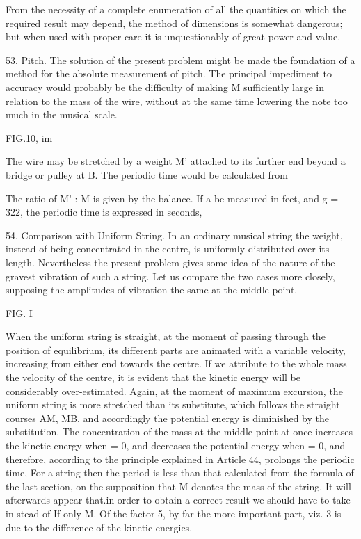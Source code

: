 From the necessity of a complete enumeration of all the quantities on which the
required result may depend, the method of dimensions is somewhat dangerous; but
when used with proper care it is unquestionably of great power and value.

53. Pitch.  The solution of the present problem might be made the foundation of
a method for the absolute measurement of pitch. The principal impediment to
accuracy would probably be the difficulty of making M sufficiently large in
relation to the mass of the wire, without at the same time lowering the note
too much in the musical scale.

FIG.10, im

The wire may be stretched by a weight M' attached to its further end beyond a
bridge or pulley at B. The periodic time would be calculated from

The ratio of M' : M is given by the balance. If a be measured in feet, and g =
322, the periodic time is expressed in seconds,

54.  Comparison with Uniform String.
In an ordinary musical string the weight, instead of being
concentrated in the centre, is uniformly distributed over its length.
Nevertheless the present problem gives some idea of the nature of the gravest
vibration of such a string. Let us compare the two cases more closely,
supposing the amplitudes of vibration the same at the middle point.

FIG. I

When the uniform string is straight, at the moment of passing through the
position of equilibrium, its different parts are animated with a variable
velocity, increasing from either end towards the centre. If we attribute to the
whole mass the velocity of the centre, it is evident that the kinetic energy
will be considerably over-estimated. Again, at the moment of maximum excursion,
the uniform string is more stretched than its substitute, which follows the
straight courses AM, MB, and accordingly the potential energy is diminished by
the substitution. The concentration of the mass at the middle point at once
increases the kinetic energy when = 0, and decreases the potential energy when
= 0, and therefore, according to the principle explained in Article 44,
prolongs the periodic time, For a string then the period is less than that
calculated from the formula of the last section, on the supposition that M
denotes the mass of the string. It will afterwards appear that.in order to
obtain a correct result we should have to take in stead of If only M. Of the
factor 5, by far the more important part, viz. 3 is due to the difference of
the kinetic energies.

